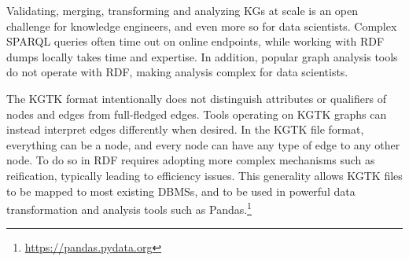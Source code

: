 \documentclass[runningheads]{llncs}
\newcommand{\kibitz}[2]{%
{\color{#1}#2}{}%
}
\newcommand{\filip}[1]{\kibitz{purple}{[FI:#1]}} %
\newcommand{\DS}[1]{\kibitz{blue}{[DS: #1]}} %
\newcommand{\DG}[1]{\kibitz{red}{[DG: #1]}} %
\begin{document}

Validating, merging, transforming and analyzing KGs at scale is an open challenge for knowledge engineers, and even more so for data scientists. Complex SPARQL queries often time out on online endpoints, while working with RDF dumps locally takes time and expertise. In addition, popular graph analysis tools do not operate with RDF, making analysis complex for data scientists.



The KGTK format intentionally does not distinguish attributes or qualifiers of nodes and edges from full-fledged edges. Tools operating on KGTK graphs can instead interpret edges differently when desired.  In the KGTK file format, everything can be a node, and every node can have any type of edge to any other node. To do so in RDF requires adopting more complex mechanisms such as reification, typically leading to efficiency issues. This generality allows KGTK files to be mapped to most existing DBMSs, and to be used in powerful data transformation and analysis tools such as Pandas.\footnote{\url{https://pandas.pydata.org}} %
\end{document}
